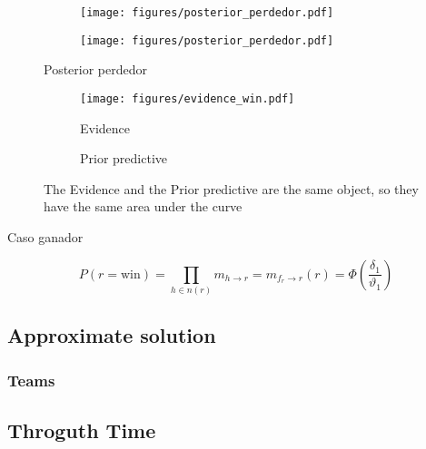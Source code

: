 \documentclass[article]{jss}
\begin{document}
\begin{figure}[t!]
\centering
  \begin{subfigure}[t]{0.48\textwidth}
  \texttt{[image: figures/posterior\_perdedor.pdf]}
  \caption{}
  \label{posterior_perdedor_image}
  \end{subfigure}
  \begin{subfigure}[t]{0.48\textwidth}
  \texttt{[image: figures/posterior\_perdedor.pdf]}
  \caption{}
  \label{posterior_perdedor_distribution}
  \end{subfigure}
  \caption{Posterior perdedor}
  \label{posterior_perdedor}
\end{figure}

 \begin{figure}[t!]
\centering
  \begin{subfigure}[t]{0.48\textwidth}
  \texttt{[image: figures/evidence\_win.pdf]}
  \caption{Evidence}
  \label{fig:evidence_win}
  \end{subfigure}
  \begin{subfigure}[t]{0.48\textwidth}
  \caption{Prior predictive}
  \label{fig:prior_predictive_win}
  \end{subfigure}
  \caption{The Evidence and the Prior predictive are the same object, so they have the same area under the curve}
  \label{fig:evidence_prior_predictive}
\end{figure}

 Caso ganador

 \begin{equation}\label{eq:prior_predictive}
  P(r=\text{win}) = \prod_{h \in n(r)} m_{h \rightarrow r}  = m_{f_r \rightarrow r}(r) =  \Phi(\frac{\delta_1}{\vartheta_1})
 \end{equation}





\subsection{Approximate solution} \label{sec:approximateSolution}
\subsubsection{Teams}

\subsection{Throguth Time} \label{sec:throguthTime}
\end{document}
